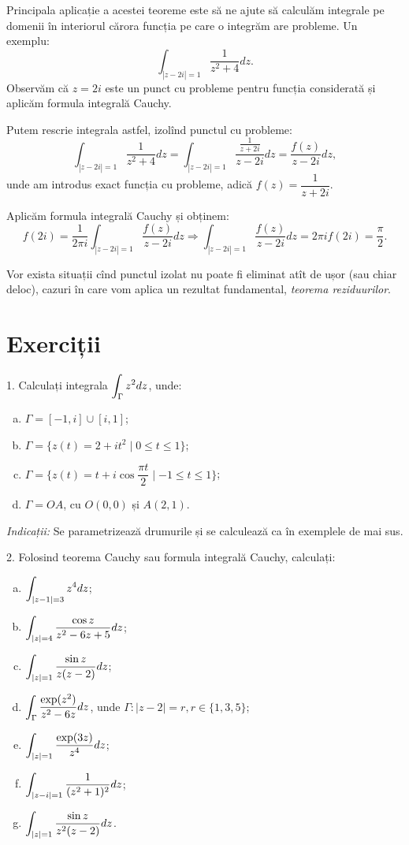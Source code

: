 Principala aplicație a acestei teoreme este să ne ajute să calculăm integrale pe
domenii în interiorul cărora funcția pe care o integrăm are probleme. Un exemplu:
\[
  \int_{|z - 2i| = 1} \dfrac{1}{z^2 + 4} dz.
\]
Observăm că $ z = 2i $ este un punct cu probleme pentru funcția considerată și
aplicăm formula integrală Cauchy.

Putem rescrie integrala astfel, izolînd punctul cu probleme:
\[
  \int_{|z - 2i| = 1} \dfrac{1}{z^2 + 4} dz = \int_{|z - 2i| = 1} \dfrac{\frac{1}{z + 2i}}{z - 2i} dz = %
  \dfrac{f(z)}{z - 2i} dz,
\]
unde am introdus exact funcția cu probleme, adică $ f(z) = \dfrac{1}{z + 2i} $.

Aplicăm formula integrală Cauchy și obținem:
\[
  f(2i) = \dfrac{1}{2\pi i} \int_{|z - 2i| = 1} \dfrac{f(z)}{z - 2i} dz \Rightarrow %
  \int_{|z - 2i| = 1} \dfrac{f(z)}{z - 2i} dz = 2\pi i f(2i) = \dfrac{\pi}{2}.
\]

Vor exista situații cînd punctul izolat nu poate fi eliminat atît de ușor (sau chiar deloc),
cazuri în care vom aplica un rezultat fundamental, \emph{teorema reziduurilor}.


\section{Exerciții}

1. Calculați integrala $ \displaystyle\int_{\Gamma} z^2 dz $, unde:
\begin{enumerate}[(a)]
\item $ \Gamma = [-1, i] \cup [i, 1] $;
\item $ \Gamma = \{ z(t) = 2 + it^2 \mid 0 \leq t \leq 1 \} $;
\item $ \Gamma = \{ z(t) = t + i \cos \dfrac{\pi t}{2} \mid -1 \leq t \leq 1 \} $;
\item $ \Gamma = OA $, cu $O(0, 0) $ și $ A(2, 1) $.
\end{enumerate}

\emph{Indicații:} Se parametrizează drumurile și se calculează ca în exemplele
de mai sus.

\vspace{1cm}

2. Folosind teorema Cauchy sau formula integrală Cauchy, calculați:
\begin{enumerate}[(a)]
\item $ \displaystyle\int_{|z - 1| = 3} z^4 dz $;
\item $ \displaystyle\int_{|z| = 4} \dfrac{\cos z}{z^2 - 6z + 5}dz $;
\item $ \displaystyle\int_{|z| = 1} \dfrac{\sin z}{z(z-2)} dz $;
\item $ \displaystyle\int_\Gamma \dfrac{\exp(z^2)}{z^2 - 6z} dz $, unde $ \Gamma: |z - 2| = r, r \in \{1, 3, 5\} $;
\item $ \displaystyle\int_{|z| = 1} \dfrac{\exp(3z)}{z^4} dz $;
\item $ \displaystyle\int_{|z - i| = 1} \dfrac{1}{(z^2 + 1)^2} dz $;
\item $ \displaystyle\int_{|z| = 1} \dfrac{\sin z}{z^2(z - 2)} dz $.
\end{enumerate}

